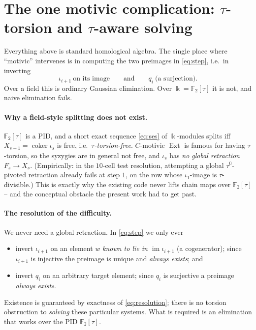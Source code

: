 \documentclass[11pt]{article}
\newcommand{\Ext}{\operatorname{Ext}}
\newcommand{\im}{\operatorname{im}}
\newcommand{\coker}{\operatorname{coker}}
\newcommand{\F}{\mathbb{F}}
\newcommand{\kk}{\Bbbk}
\theoremstyle{definition}
\begin{document}
\section{The one motivic complication: $\tau$-torsion and $\tau$-aware solving}

Everything above is standard homological algebra. The single place where ``motivic''
intervenes is in computing the two preimages in \eqref{eq:step}, i.e.\ in inverting
\[
  \iota_{i+1}\ \text{on its image}\qquad\text{and}\qquad q_i\ \text{(a surjection).}
\]
Over a field this is ordinary Gaussian elimination. Over $\kk=\F_2[\tau]$ it is not,
and naive elimination fails.

\paragraph{Why a field-style splitting does not exist.}
$\F_2[\tau]$ is a PID, and a short exact sequence \eqref{eq:ses} of $\kk$-modules
splits iff $X_{s+1}=\coker\iota_s$ is free, i.e.\ \emph{$\tau$-torsion-free}.
$C$-motivic $\Ext$ is famous for having $\tau$-torsion, so the syzygies are in
general not free, and $\iota_s$ has \emph{no global retraction}
$F_s\to X_s$. (Empirically: in the $10$-cell test resolution, attempting a global
$\tau^0$-pivoted retraction already fails at step $1$, on the row whose $\iota_1$-image
is $\tau$-divisible.) This is exactly why the existing code never lifts chain maps
over $\F_2[\tau]$ -- and the conceptual obstacle the present work had to get past.

\paragraph{The resolution of the difficulty.}
We never need a global retraction. In \eqref{eq:step} we only ever
\begin{itemize}[leftmargin=*]
\item invert $\iota_{i+1}$ on an element $w$ \emph{known to lie in $\im\iota_{i+1}$}
  (a cogenerator); since $\iota_{i+1}$ is injective the preimage is unique and
  \emph{always exists}; and
\item invert $q_i$ on an arbitrary target element; since $q_i$ is surjective a
  preimage \emph{always exists}.
\end{itemize}
Existence is guaranteed by exactness of \eqref{eq:resolution}; there is no torsion
obstruction to \emph{solving} these particular systems. What is required is an
elimination that works over the PID $\F_2[\tau]$.
\end{document}
